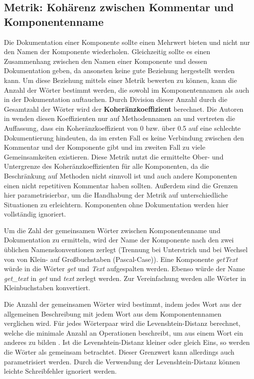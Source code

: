 \subsection{Metrik: Kohärenz zwischen Kommentar und Komponentenname}\label{chapter:metrics_coherence}
Die Dokumentation einer Komponente sollte einen Mehrwert bieten und nicht nur den Namen der Komponente wiederholen. Gleichzeitig sollte es einen Zusammenhang zwischen den Namen einer Komponente und dessen Dokumentation geben, da ansonsten keine gute Beziehung hergestellt werden kann\cite[S. 86-87]{Qualityanalysisofsourcecodecomments}. Um diese Beziehung mittels einer Metrik bewerten zu können, kann die Anzahl der Wörter bestimmt werden, die sowohl im Komponentennamen als auch in der Dokumentation auftauchen. Durch Division dieser Anzahl durch die Gesamtzahl der Wörter wird der \textbf{Koheränzkoeffizient} berechnet. Die Autoren in \cite[S. 86-87]{Qualityanalysisofsourcecodecomments} wenden diesen Koeffizienten nur auf Methodennamen an und vertreten die Auffassung, dass ein Koheränzkoeffizient von 0 bzw. über 0.5 auf eine schlechte Dokumentierung hindeuten, da im ersten Fall es keine Verbindung zwischen den Kommentar und der Komponente gibt und im zweiten Fall zu viele Gemeinsamkeiten existieren. Diese Metrik nutzt die ermittelte Ober- und Untergrenze des Koheränzkoeffizienten für alle Komponenten, da die Beschränkung auf Methoden nicht sinnvoll ist und auch andere Komponenten einen nicht repetitiven Kommentar haben sollten. Außerdem sind die Grenzen hier parametrisierbar, um die Handhabung der Metrik auf unterschiedliche Situationen zu erleichtern. Komponenten ohne Dokumentation werden hier vollständig ignoriert. 

Um die Zahl der  gemeinsamen Wörter zwischen Komponentenname und Dokumentation zu ermitteln, wird der Name der Komponente nach den zwei üblichen Namenskonventionen zerlegt (Trennung bei Unterstrich und bei Wechsel von von Klein- auf Großbuchstaben (Pascal-Case)). Eine Komponente \textit{getText} würde in die Wörter \textit{get} und \textit{Text} aufgespalten werden. Ebenso würde der Name \textit{get\_text} in  \textit{get} und \textit{text} zerlegt werden. Zur Vereinfachung werden alle Wörter in Kleinbuchstaben konvertiert. 

Die Anzahl der gemeinsamen Wörter wird bestimmt, indem jedes Wort aus der allgemeinen Beschreibung mit jedem Wort aus dem Komponentennamen verglichen wird. Für jedes Wörterpaar wird die Levenshtein-Distanz berechnet, welche die minimale Anzahl an Operationen beschreibt, um aus einem Wort ein anderes zu bilden \cite[S. 1091]{ANormalizedLevenshteinDistanceMetric}. Ist  die Levenshtein-Distanz kleiner oder gleich Eins, so werden die Wörter als gemeinsam betrachtet. Dieser Grenzwert kann allerdings auch parametrisiert werden. Durch die Verwendung der Levenshtein-Distanz können leichte Schreibfehler ignoriert werden. 

